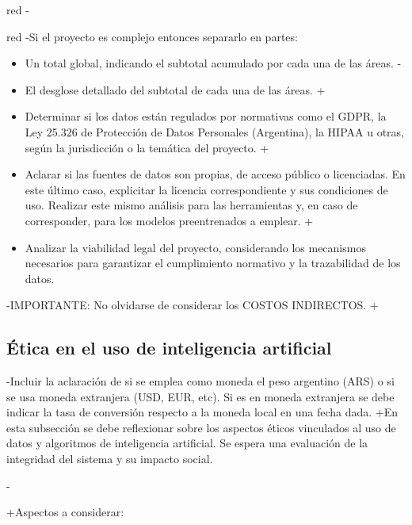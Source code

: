 \documentclass[
 11pt, %
-%
+codirector, %
 ]{charter}
\begin{document}
\begin{table}[ht]
\begin{table}[ht]
\begin{consigna}{red}
-\begin{consigna}{red}
-Si el proyecto es complejo entonces separarlo en partes:
 \begin{itemize}
-	\item Un total global, indicando el subtotal acumulado por cada una de las áreas.
-	\item El desglose detallado del subtotal de cada una de las áreas.
+  \item Determinar si los datos están regulados por normativas como el GDPR, la Ley 25.326 de Protección de Datos Personales (Argentina), la HIPAA u otras, según la jurisdicción o la temática del proyecto.
+  \item Aclarar si las fuentes de datos son propias, de acceso público o licenciadas. En este último caso, explicitar la licencia correspondiente y sus condiciones de uso. Realizar este mismo análisis para las herramientas y, en caso de corresponder, para los modelos preentrenados a emplear.
+  \item Analizar la viabilidad legal del proyecto, considerando los mecanismos necesarios para garantizar el cumplimiento normativo y la trazabilidad de los datos.
 \end{itemize}
 
-IMPORTANTE: No olvidarse de considerar los COSTOS INDIRECTOS.
+\subsection{Ética en el uso de inteligencia artificial}
 
-Incluir la aclaración de si se emplea como moneda el peso argentino (ARS) o si se usa moneda extranjera (USD, EUR, etc). Si es en moneda extranjera se debe indicar la tasa de conversión respecto a la moneda local en una fecha dada.
+En esta subsección se debe reflexionar sobre los aspectos éticos vinculados al uso de datos y algoritmos de inteligencia artificial. Se espera una evaluación de la integridad del sistema y su impacto social.
 
-\end{consigna}
+Aspectos a considerar:
 

\end{consigna}
\end{table}
\end{table}
\end{document}
